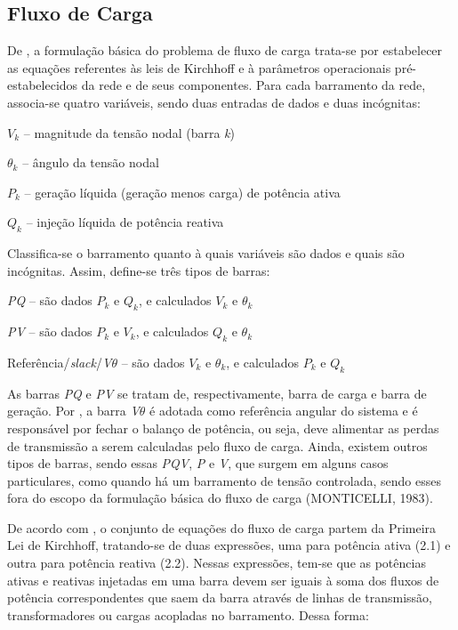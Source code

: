 \documentclass[12pt,oneside,a4paper,chapter=TITLE,section=TITLE,sumario=tradicional,english,brazil]{abntex2}
\begin{document}
\subsection{Fluxo de Carga}
De \textcite{monticelli1983}, a formulação básica do problema de fluxo de carga trata-se por estabelecer as equações referentes às leis de Kirchhoff e à parâmetros operacionais pré-estabelecidos da rede e de seus componentes. Para cada barramento da rede, associa-se quatro variáveis, sendo duas entradas de dados e duas incógnitas:\par 
$V_{k}$ -- magnitude da tensão nodal (barra \textit{k})\par
$\theta_{k}$ -- ângulo da tensão nodal\par
$P_{k}$ -- geração líquida (geração menos carga) de potência ativa\par 
$Q_{k}$ -- injeção líquida de potência reativa\par
Classifica-se o barramento quanto à quais variáveis são dados e quais são incógnitas. Assim, define-se três tipos de barras:\par 
\textit{PQ} -- são dados $P_{k}$ e $Q_{k}$, e calculados $V_{k}$ e $\theta_{k}$\par 
\textit{PV} -- são dados $P_{k}$ e $V_{k}$, e calculados $Q_{k}$ e $\theta_{k}$\par 
Referência/\textit{slack}/\textit{V}$\theta$ -- são dados $V_{k}$ e $\theta_{k}$, e calculados $P_{k}$ e $Q_{k}$\par 
As barras \textit{PQ} e \textit{PV} se tratam de, respectivamente, barra de carga e barra de geração. Por \textcite{monticelli1983}, a barra \textit{V}$\theta$ é adotada como referência angular do sistema e é responsável por fechar o balanço de potência, ou seja, deve alimentar as perdas de transmissão a serem calculadas pelo fluxo de carga. Ainda, existem outros tipos de barras, sendo essas \textit{PQV}, \textit{P} e \textit{V}, que surgem em alguns casos particulares, como quando há um barramento de tensão controlada, sendo esses fora do escopo da formulação básica do fluxo de carga (MONTICELLI, 1983). \par 
De acordo com \textcite{monticelli1983}, o conjunto de equações do fluxo de carga partem da Primeira Lei de Kirchhoff, tratando-se de duas expressões, uma para potência ativa (2.1) e outra para potência reativa (2.2). Nessas expressões, tem-se que as potências ativas e reativas injetadas em uma barra devem ser iguais à soma dos fluxos de potência correspondentes que saem da barra através de linhas de transmissão, transformadores ou cargas acopladas no barramento. Dessa forma:\par 
\end{document}

